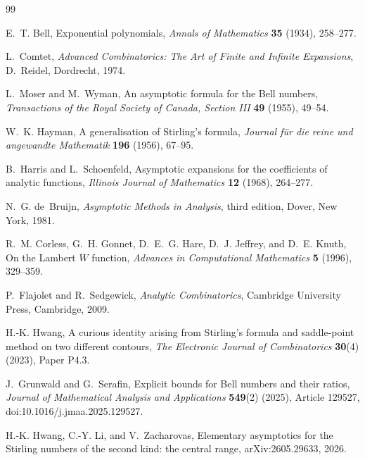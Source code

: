 \documentclass[11pt,a4paper]{article}
\theoremstyle{definition}
\theoremstyle{remark}
\begin{document}
\begin{thebibliography}{99}

E.~T. Bell,
\newblock Exponential polynomials,
\newblock \emph{Annals of Mathematics} \textbf{35} (1934), 258--277.

L.~Comtet,
\newblock \emph{Advanced Combinatorics: The Art of Finite and Infinite
Expansions},
\newblock D.~Reidel, Dordrecht, 1974.

L.~Moser and M.~Wyman,
\newblock An asymptotic formula for the Bell numbers,
\newblock \emph{Transactions of the Royal Society of Canada, Section III}
\textbf{49} (1955), 49--54.

W.~K. Hayman,
\newblock A generalisation of Stirling's formula,
\newblock \emph{Journal f\"ur die reine und angewandte Mathematik}
\textbf{196} (1956), 67--95.

B.~Harris and L.~Schoenfeld,
\newblock Asymptotic expansions for the coefficients of analytic functions,
\newblock \emph{Illinois Journal of Mathematics} \textbf{12} (1968),
264--277.

N.~G. de~Bruijn,
\newblock \emph{Asymptotic Methods in Analysis}, third edition,
\newblock Dover, New York, 1981.

R.~M. Corless, G.~H. Gonnet, D.~E.~G. Hare, D.~J. Jeffrey, and D.~E. Knuth,
\newblock On the Lambert \(W\) function,
\newblock \emph{Advances in Computational Mathematics} \textbf{5} (1996),
329--359.

P.~Flajolet and R.~Sedgewick,
\newblock \emph{Analytic Combinatorics},
\newblock Cambridge University Press, Cambridge, 2009.

H.-K. Hwang,
\newblock A curious identity arising from Stirling's formula and saddle-point
method on two different contours,
\newblock \emph{The Electronic Journal of Combinatorics} \textbf{30}(4)
(2023), Paper P4.3.

J.~Grunwald and G.~Serafin,
\newblock Explicit bounds for Bell numbers and their ratios,
\newblock \emph{Journal of Mathematical Analysis and Applications}
\textbf{549}(2) (2025), Article 129527,
\newblock doi:10.1016/j.jmaa.2025.129527.

H.-K. Hwang, C.-Y. Li, and V.~Zacharovas,
\newblock Elementary asymptotics for the Stirling numbers of the second kind:
the central range,
\newblock arXiv:2605.29633, 2026.


\end{thebibliography}
\end{document}
